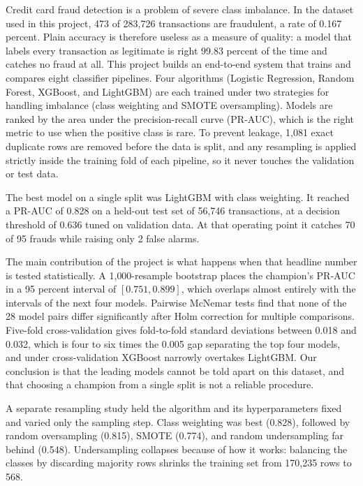 \setlength{\parskip}{1em}
Credit card fraud detection is a problem of severe class imbalance. In the dataset used in
this project, 473 of 283{,}726 transactions are fraudulent, a rate of 0.167 percent. Plain
accuracy is therefore useless as a measure of quality: a model that labels every
transaction as legitimate is right 99.83 percent of the time and catches no fraud at all.
This project builds an end-to-end system that trains and compares eight classifier
pipelines. Four algorithms (Logistic Regression, Random Forest, XGBoost, and LightGBM) are
each trained under two strategies for handling imbalance (class weighting and SMOTE
oversampling). Models are ranked by the area under the precision-recall curve (PR-AUC),
which is the right metric to use when the positive class is rare. To prevent leakage,
1{,}081 exact duplicate rows are removed before the data is split, and any resampling is
applied strictly inside the training fold of each pipeline, so it never touches the
validation or test data.

The best model on a single split was LightGBM with class weighting. It reached a PR-AUC of
0.828 on a held-out test set of 56{,}746 transactions, at a decision threshold of 0.636
tuned on validation data. At that operating point it catches 70 of 95 frauds while raising
only 2 false alarms.

The main contribution of the project is what happens when that headline number is tested
statistically. A 1{,}000-resample bootstrap places the champion's PR-AUC in a 95 percent
interval of $[0.751, 0.899]$, which overlaps almost entirely with the intervals of the next
four models. Pairwise McNemar tests find that none of the 28 model pairs differ
significantly after Holm correction for multiple comparisons. Five-fold cross-validation
gives fold-to-fold standard deviations between 0.018 and 0.032, which is four to six times
the 0.005 gap separating the top four models, and under cross-validation XGBoost narrowly
overtakes LightGBM. Our conclusion is that the leading models cannot be told apart on this
dataset, and that choosing a champion from a single split is not a reliable procedure.

A separate resampling study held the algorithm and its hyperparameters fixed and varied
only the sampling step. Class weighting was best (0.828), followed by random oversampling
(0.815), SMOTE (0.774), and random undersampling far behind (0.548). Undersampling
collapses because of how it works: balancing the classes by discarding majority rows
shrinks the training set from 170{,}235 rows to 568.

